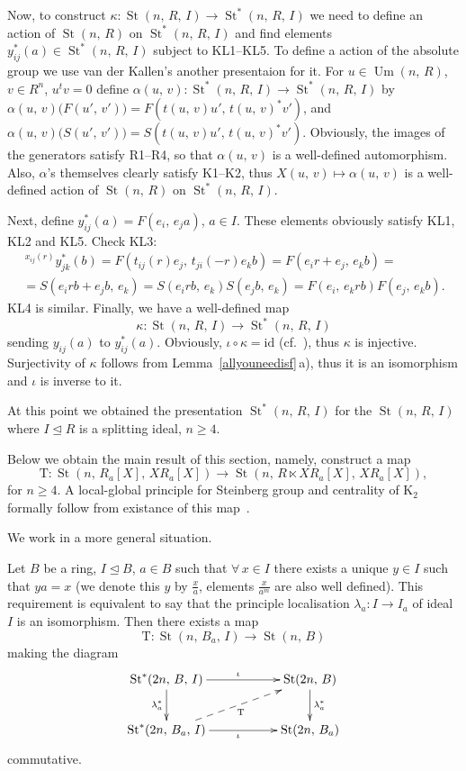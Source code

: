 \documentclass[11pt]{amsart}
\theoremstyle{plain} \declaretheorem[name=Theorem, Refname={Theorem,Theorems}]{tm} \Crefname{tm}{Theorem}{Theorems}
\numberwithin{equation}{section}
\theoremstyle{definition} \newtheorem{df}[lm]{Definition} \Crefname{df}{Definition}{Definitions}
\theoremstyle{remark} \newtheorem{rk}[lm]{Remark} \Crefname{rk}{Remark}{Remarks}
\newcommand{\Um}{\mathop{\mathrm{Um}}\nolimits}
\newcommand{\St}{\mathop{\mathrm{St}}\nolimits}
\begin{document}
Now, to construct
$
\kappa\colon\St(n,\,R,\,I)\rightarrow\St^*(n,\,R,\,I)
$
we need to define an action of $\St(n,\,R)$ on $\St^*(n,\,R,\,I)$ and find elements $y^*_{ij}(a)\in\St^*(n,\,R,\,I)$ subject to KL1--KL5. To define a action of the absolute group we use van der Kallen's another presentaion for it. For $u\in\Um(n,\,R)$, $v\in R^n$, $u^tv=0$ define
$
\alpha(u,\,v)\colon\St^*(n,\,R,\,I)\rightarrow\St^*(n,\,R,\,I)
$
by $\alpha(u,\,v)\big(F(u',\,v')\big)=F(t(u,\,v)u',\,t(u,\,v)^*v')$, and $\alpha(u,\,v)\big(S(u',\,v')\big)=S(t(u,\,v)u',\,t(u,\,v)^*v')$. Obviously, the images of the generators satisfy R1--R4, so that $\alpha(u,\,v)$ is a well-defined automorphism. Also, $\alpha$'s themselves clearly satisfy K1--K2, thus $X(u,\,v)\mapsto\alpha(u,\,v)$ is a well-defined action of $\St(n,\,R)$ on $\St^*(n,\,R,\,I)$.

Next, define $y_{ij}^*(a)=F(e_i,\,e_ja)$, $a\in I$. These elements obviously satisfy KL1, KL2 and KL5. Check KL3:
\begin{multline*}
\!\,^{x_{ij}(r)}y^*_{jk}(b)=F(t_{ij}(r)e_j,\,t_{ji}(-r)e_kb)=F(e_ir+e_j,\,e_kb)=\\
=S(e_irb+e_jb,\,e_k)=S(e_irb,\,e_k)S(e_jb,\,e_k)=F(e_i,\,e_krb)F(e_j,\,e_kb).
\end{multline*} 
KL4 is similar. Finally, we have a well-defined map
$$
\kappa\colon\St(n,\,R,\,I)\rightarrow\St^*(n,\,R,\,I)
$$
sending $y_{ij}(a)$ to $y^*_{ij}(a)$. Obviously, $\iota\circ\kappa=\mathrm{id}$ (cf.~\cite[3.6\,d)]{vdK}), thus $\kappa$ is injective. Surjectivity of $\kappa$ follows from Lemma~\ref{allyouneedisf}\,a), thus it is an isomorphism and $\iota$ is inverse to it.

At this point we obtained the presentation $\St^*(n,\,R,\,I)$ for the $\St(n,\,R,\,I)$ where $I\trianglelefteq R$ is a splitting ideal, $n\geq4$.

Below we obtain the main result of this section, namely, construct a map 
$$
\mathrm T\colon\St(n,\,R_a[X],\,XR_a[X])\rightarrow\St(n,\,R\ltimes XR_a[X],\,XR_a[X]),
$$
for $n\geq4$. A local-global principle for Steinberg group and centrality of $\mathrm K_2$ formally follow from existance of this map~\cite[Lem.~15, Lem.~16, proof of Th.~2]{SCh}.

We work in a more general situation.

\begin{tm}
\label{a3map}
Let $B$ be a ring, $I\trianglelefteq B$, $a\in B$ such that $\forall\,x\in I$ there exists a unique $y\in I$ such that $ya=x$ {\rm(}we denote this $y$ by $\frac xa$, elements $\frac x{a^m}$ are also well defined{\rm)}. This requirement is equivalent to say that the principle localisation $\lambda_a\colon I\rightarrow I_a$ of ideal $I$ is an isomorphism. Then there exists a map
$$
\mathrm T\colon\St(n,\,B_a,\,I)\rightarrow\St(n,\,B)
$$
making the diagram
$$
\xymatrix{
\St^*(2n,\,B,\,I)\ar@<-0.0ex>[rr]^{\iota}\ar@<-0.0ex>[d]_{\lambda_{a}^*}&&\St(2n,\,B)\ar@<-0.0ex>[d]^{\lambda_{a}^*}\\
\St^*(2n,\,B_a,\,I)\ar@<-0.0ex>[rr]_{\iota}\ar@{-->}[rru]_{\mathrm T}&&\St(2n,\,B_a)
}
$$
commutative.
\end{tm}
\end{document}
